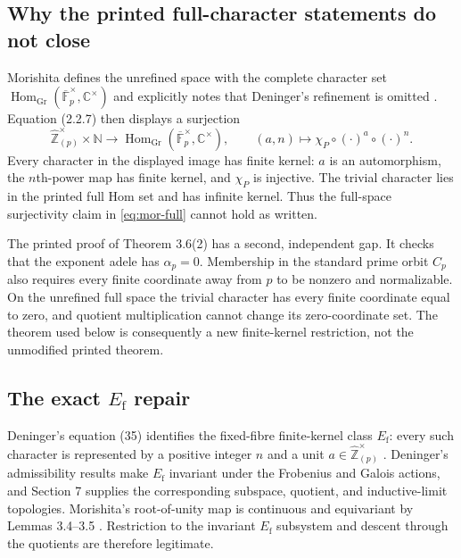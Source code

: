 \documentclass[11pt,a4paper]{article}
\theoremstyle{definition}
\newcommand{\N}{\mathbb N}
\newcommand{\C}{\mathbb C}
\newcommand{\Z}{\mathbb Z}
\newcommand{\whZ}{\widehat{\Z}}
\newcommand{\Ef}{E_{\mathrm f}}
\begin{document}
\subsection{Why the printed full-character statements do not close}

Morishita defines the unrefined space with the complete character set
$\operatorname{Hom}_{\mathrm{Gr}}(\overline{\mathbb F}_p^\times,\C^\times)$
and explicitly notes that Deninger's refinement is omitted
\citep[equation (2.1.5) and Remark 2.1.13]{Morishita2026}.  Equation (2.2.7)
then displays a surjection
\begin{equation}
 \whZ_{(p)}^\times\times\N
 \longrightarrow
 \operatorname{Hom}_{\mathrm{Gr}}(\overline{\mathbb F}_p^\times,\C^\times),
 \qquad
 (a,n)\longmapsto\chi_P\circ(\cdot)^a\circ(\cdot)^n .
 \label{eq:mor-full}
\end{equation}
Every character in the displayed image has finite kernel: $a$ is an
automorphism, the $n$th-power map has finite kernel, and $\chi_P$ is
injective.  The trivial character lies in the printed full Hom set and has
infinite kernel.  Thus the full-space surjectivity claim in
\eqref{eq:mor-full} cannot hold as written.

The printed proof of Theorem 3.6(2) has a second, independent gap.  It checks
that the exponent adele has $\alpha_p=0$.  Membership in the standard prime
orbit $C_p$ also requires every finite coordinate away from $p$ to be
nonzero and normalizable.  On the unrefined full space the trivial character
has every finite coordinate equal to zero, and quotient multiplication cannot
change its zero-coordinate set.  The theorem used below is consequently a new
finite-kernel restriction, not the unmodified printed theorem.

\subsection{The exact \texorpdfstring{$\Ef$}{E-f} repair}

Deninger's equation (35) identifies the fixed-fibre finite-kernel class
$\Ef$: every such character is represented by a positive integer $n$ and a
unit $a\in\whZ_{(p)}^\times$ \citep[equation (35)]{Deninger2026}.  Deninger's
admissibility results make $\Ef$ invariant under the Frobenius and Galois
actions, and Section 7 supplies the corresponding subspace, quotient, and
inductive-limit topologies.  Morishita's root-of-unity map is continuous and
equivariant by Lemmas 3.4--3.5 \citep{Morishita2026}.  Restriction to the
invariant $\Ef$ subsystem and descent through the quotients are therefore
legitimate.
\end{document}
